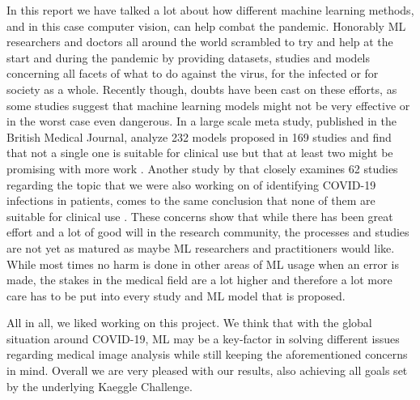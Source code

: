 In this report we have talked a lot about how different machine learning methods, and in this case computer vision, can help combat the pandemic. Honorably ML researchers and doctors all around the world scrambled to try and help at the start and during the pandemic by providing datasets, studies and models concerning all facets of what to do against the virus, for the infected or for society as a whole. Recently though, doubts have been cast on these efforts, as some studies suggest that machine learning models might not be very effective or in the worst case even dangerous. In a large scale meta study, published in the British Medical Journal, \citeauthor{wynants_prediction_2020} analyze 232 models proposed in 169 studies and find that not a single one is suitable for clinical use but that at least two might be promising with more work \autocite{wynants_prediction_2020}. Another study by \citeauthor{aix-covnet_common_2021} that closely examines 62 studies regarding the topic that we were also working on of identifying COVID-19 infections in patients, comes to the same conclusion that none of them are suitable for clinical use \autocite{aix-covnet_common_2021}. These concerns show that while there has been great effort and a lot of good will in the research community, the processes and studies are not yet as matured as maybe ML researchers and practitioners would like. While most times no harm is done in other areas of ML usage when an error is made, the stakes in the medical field are a lot higher and therefore a lot more care has to be put into every study and ML model that is proposed.

All in all, we liked working on this project. We think that with the global situation around COVID-19, ML may be a key-factor in solving different issues regarding medical image analysis while still keeping the aforementioned concerns in mind. Overall we are very pleased with our results, also achieving all goals set by the underlying Kaeggle Challenge.
